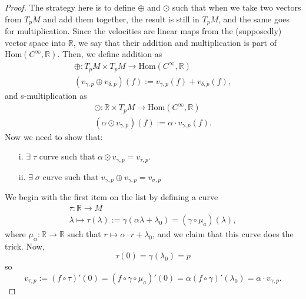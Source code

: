 \begin{proof}
    The strategy here is to define $\oplus$ and $\odot$ such that when we take two vectors from $T_pM$ and add them together, the result is still in $T_pM$, and the same goes for multiplication. Since the velocities are linear maps from the (supposedly) vector space into $\mathbb{R}$, we say that their addition and multiplication is part of $\text{Hom}(C^\infty, \mathbb{R})$. Then, we define addition as
    \begin{align*}
        \oplus: T_pM \times T_pM \longrightarrow \text{Hom}(C^\infty, \mathbb{R}) \\
        (v_{\gamma,p} \oplus v_{\delta,p})(f) := v_{\gamma,p}(f) + v_{\delta,p}(f),
    \end{align*}
    and s-multiplication as
    \begin{align*}
        \odot: \mathbb{R} \times T_pM \longrightarrow \text{Hom}(C^\infty, \mathbb{R}) \\
        (\alpha \odot v_{\gamma,p})(f) := \alpha \cdot v_{\gamma,p}(f).
    \end{align*}
    Now we need to show that:
    \begin{itemize}
        \item[i.] $\exists \; \tau$ curve such that $\alpha \odot v_{\gamma,p} = v_{\tau,p}$.
        \item[ii.] $\exists \; \sigma$ curve such that $v_{\gamma, p} \oplus v_{\gamma,p} = v_{\sigma, p}$
    \end{itemize}

    We begin with the first item on the list by defining a curve
    \begin{align*}
        \tau: \mathbb{R} \longrightarrow M \\
        \lambda \longmapsto \tau(\lambda) := \gamma(\alpha \lambda + \lambda_0) = (\gamma \circ \mu_a)(\lambda),
    \end{align*}
    where $\mu_\alpha: \mathbb{R} \longrightarrow \mathbb{R}$ such that $ r \longmapsto \alpha \cdot r + \lambda_0$, and we claim that this curve does the trick. Now,
    \[
        \tau(0) = \gamma(\lambda_0) = p
    \]
    so
    \[
        v_{\tau,p}:= (f \circ \tau)'(0) = (f \circ \gamma \circ \mu_a)'(0) = \alpha (f \circ \gamma)'(\lambda_0) = \alpha \cdot v_{\gamma,p}.
    \]


\end{proof}
